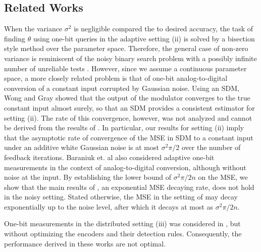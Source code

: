 \subsection*{Related Works}
When the variance $\sigma^2$ is negligible compared the to desired accuracy, the task of finding $\theta$ using one-bit queries in the adaptive setting (ii) is solved by a bisection style method over the parameter space. Therefore, the general case of non-zero variance is reminiscent of the noisy binary search problem with a possibly infinite number of unreliable tests \cite{cicalese2002least, Karp:2007:NBS:1283383.1283478}. However, since we assume a continuous parameter space, a more closely related problem is that of one-bit analog-to-digital conversion of a constant input corrupted by Gaussian noise. Using an SDM, Wong and Gray \cite{53738} showed that the output of the modulator converges to the true constant input almost surely, so that an SDM provides a consistent estimator for setting (ii). The rate of this convergence, however, was not analyzed and cannot be derived from the results of \cite{53738}. In particular, our results for setting (ii) imply that the asymptotic rate of convergence of the MSE in SDM to a constant input under an additive white Gaussian noise is at most $\sigma^2\pi/2$ over the number of feedback iterations. Baraniuk et. al \cite{baraniuk2017exponential} also considered adaptive one-bit measurements in the context of analog-to-digital conversion, although without noise at the input. By establishing the lower bound of $\sigma^2\pi/2n$ on the MSE, we show that the main results of \cite{baraniuk2017exponential}, an exponential MSE decaying rate, does not hold in the noisy setting. Stated otherwise, the MSE in the setting of \cite{baraniuk2017exponential} may decay exponentially up to the noise level, after which it decays at most as $\sigma^2\pi/2n$. \par
%
One-bit measurements in the distributed setting (iii) was considered in \cite{904560,4244748, 6882252, chen2010performance, 5184907}, but without optimizing the encoders and their detection rules. Consequently, the performance derived in these works are not optimal. 
